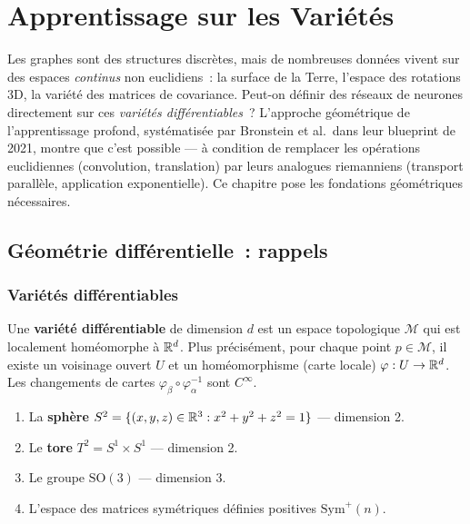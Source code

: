 \chapter{Apprentissage sur les Vari\'et\'es}
\label{ch:varietes}

Les graphes sont des structures discr\`etes, mais de nombreuses donn\'ees vivent sur des espaces \emph{continus} non euclidiens~: la surface de la Terre, l'espace des rotations 3D, la vari\'et\'e des matrices de covariance. Peut-on d\'efinir des r\'eseaux de neurones directement sur ces \emph{vari\'et\'es diff\'erentiables}~? L'approche g\'eom\'etrique de l'apprentissage profond, syst\'ematis\'ee par Bronstein et al.\ dans leur \og blueprint \fg de 2021, montre que c'est possible --- \`a condition de remplacer les op\'erations euclidiennes (convolution, translation) par leurs analogues riemanniens (transport parall\`ele, application exponentielle). Ce chapitre pose les fondations g\'eom\'etriques n\'ecessaires.

\section{G\'eom\'etrie diff\'erentielle~: rappels}

\subsection{Vari\'et\'es diff\'erentiables}

\begin{definition}
Une \textbf{vari\'et\'e diff\'erentiable} de dimension $d$ est un espace
topologique $\mathcal{M}$ qui est localement hom\'eomorphe \`a $\mathbb{R}^d$. Plus
pr\'ecis\'ement, pour chaque point $p \in \mathcal{M}$, il existe un voisinage
ouvert $U$ et un hom\'eomorphisme (carte locale) $\varphi: U \to \mathbb{R}^d$. Les
changements de cartes $\varphi_\beta \circ \varphi_\alpha^{-1}$ sont $C^\infty$.
\end{definition}

\begin{exemple}
\begin{enumerate}
    \item La \textbf{sph\`ere} $S^2 = \{(x,y,z) \in \mathbb{R}^3 : x^2 + y^2 + z^2 = 1\}$
          --- dimension 2.
    \item Le \textbf{tore} $T^2 = S^1 \times S^1$ --- dimension 2.
    \item Le groupe $\mathrm{SO}(3)$ --- dimension 3.
    \item L'espace des matrices sym\'etriques d\'efinies positives $\mathrm{Sym}^+(n)$.
\end{enumerate}
\end{exemple}

